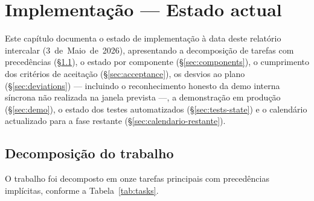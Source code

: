 
\section{Implementação --- Estado actual}
\label{cap:implementacao}

Este capítulo documenta o estado de implementação à data deste
relatório intercalar (3~de~Maio~de~2026), apresentando a
decomposição de tarefas com precedências (\S\ref{sec:tasks}), o
estado por componente (\S\ref{sec:components}), o cumprimento dos
critérios de aceitação (\S\ref{sec:acceptance}), os desvios ao plano
(\S\ref{sec:deviations}) --- incluindo o reconhecimento honesto da
demo interna síncrona não realizada na janela prevista ---,
a demonstração em produção (\S\ref{sec:demo}), o estado dos testes
automatizados (\S\ref{sec:tests-state}) e o calendário actualizado
para a fase restante (\S\ref{sec:calendario-restante}).

\subsection{Decomposição do trabalho}
\label{sec:tasks}

O trabalho foi decomposto em onze tarefas principais com precedências
implícitas, conforme a Tabela~\ref{tab:tasks}.


